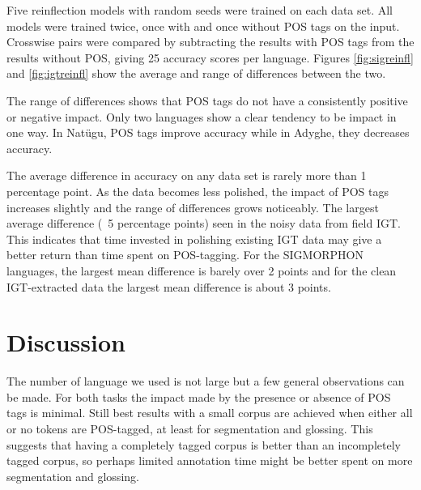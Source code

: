 Five reinflection models with random seeds were trained on each data set. All models were trained twice, once with and once without POS tags on the input. Crosswise pairs were compared by subtracting the results with POS tags from the results without POS, giving 25 accuracy scores per language. Figures \ref{fig:sigreinfl} and \ref{fig:igtreinfl} show the average and range of differences between the two.  

The range of differences shows that POS tags do not have a consistently positive or negative impact. Only two languages show a clear tendency to be impact in one way. In Nat\"ugu, POS tags improve accuracy while in Adyghe, they decreases accuracy. 

The average difference in accuracy on any data set is rarely more than 1 percentage point. As the data becomes less polished, the impact of POS tags increases slightly and the range of differences grows noticeably. The largest average difference (~5 percentage points) seen in the noisy data from field IGT. This indicates that time invested in polishing existing IGT data may give a better return than time spent on POS-tagging. For the SIGMORPHON languages, the largest mean difference is barely over 2 points and for the clean IGT-extracted data the largest mean difference is about 3 points. 



\section{Discussion}
\label{sec:discussion}

The number of language we used is not large but a few general observations can be made. For both tasks the impact made by the presence or absence of POS tags is minimal. 
Still best results with a small corpus are achieved when either all or no tokens are POS-tagged, at least for segmentation and glossing. This suggests that having a completely tagged corpus is better than an incompletely tagged corpus, so perhaps limited annotation time might be better spent on more segmentation and glossing. 

